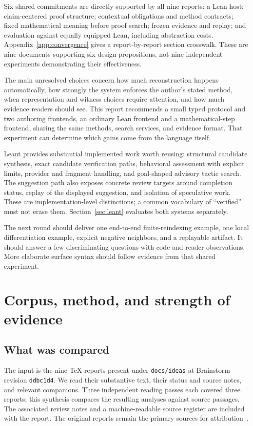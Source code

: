 \documentclass[11pt,letterpaper]{article}
\newcommand{\code}[1]{\nolinkurl{#1}}
\begin{document}
Six shared commitments are directly supported by all nine reports: a Lean host;
claim-centered proof structure; contextual obligations and method contracts;
fixed mathematical meaning before proof search; frozen evidence and replay;
and evaluation against equally equipped Lean, including abstraction costs.
Appendix~\ref{app:convergence} gives a report-by-report section crosswalk.
These are nine documents supporting six design propositions, not nine independent
experiments demonstrating their effectiveness.

The main unresolved choices concern how much reconstruction happens automatically,
how strongly the system enforces the author's stated method, when representation
and witness choices require attention, and how much evidence readers should see.
This report recommends a small typed protocol and two authoring frontends, an
ordinary Lean frontend and a mathematical-step frontend, sharing the same methods,
search services, and evidence format. That experiment can determine which gains
come from the language itself.

Leant provides substantial implemented work worth reusing: structural candidate
synthesis, exact candidate verification paths, behavioral assessment with explicit
limits, provider and fragment handling, and goal-shaped advisory tactic search.
The suggestion path also exposes concrete review targets around completion status,
replay of the displayed suggestion, and isolation of speculative work. These are
implementation-level distinctions; a common vocabulary of ``verified'' must not
erase them. Section~\ref{sec:leant} evaluates both systems separately.

The next round should deliver one end-to-end finite-reindexing example, one local
differentiation example, explicit negative neighbors, and a replayable artifact.
It should answer a few discriminating questions with code and reader observations.
More elaborate surface syntax should follow evidence from that shared experiment.

\clearpage
\tableofcontents
\clearpage

\section{Corpus, method, and strength of evidence}\label{sec:method}
\subsection{What was compared}
The input is the nine TeX reports present under \code{docs/ideas} at Brainstorm
revision \code{ddbc1d4}. We read their substantive text, their status and source
notes, and relevant companions. Three independent reading passes each covered
three reports; this synthesis compares the resulting analyses against source
passages. The associated review notes and a machine-readable source register
are included with the report. The original reports remain the primary sources
for attribution~\cite{contour,loom,mathstep,mpl,mosaic,motive,outline,reason,spine}.
\end{document}
